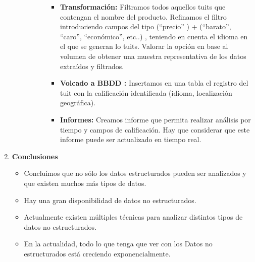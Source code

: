\documentclass[12pt,a4paper,oneside]{book}
\begin{document}
\begin{enumerate}
\begin{enumerate}
\begin{enumerate}
\begin{itemize}
\begin{itemize}
									\item \textbf{ Transformación:} Filtramos todos aquellos tuits que contengan el nombre del producto. Refinamos el filtro introduciendo campos del tipo (“precio” ) +  (“barato”, “caro”, “económico”, etc..) , teniendo en cuenta el idioma en el que  se generan lo tuits. Valorar la opción en base al volumen de obtener una muestra representativa de los datos extraídos y filtrados.
									
									\item \textbf{  Volcado a BBDD :} Insertamos en una tabla el registro del tuit con la calificación identificada (idioma, localización geográfica).
									
									\item \textbf{ Informes:} Creamos informe que permita realizar análisis por tiempo y campos de calificación. Hay que considerar que este informe puede ser actualizado en tiempo real.
									
									
									
									
								\end{itemize}
							
							
						\end{itemize}
						
						
						
					\end{enumerate}
				
				
					
				\end{enumerate}
		\item \textbf{Conclusiones } 
		
		 \begin{itemize}
			

			\item Concluimos que no sólo los datos estructurados pueden ser analizados y que existen muchos más tipos de datos.
			
			\item Hay una gran disponibilidad de datos no estructurados.
			
			\item Actualmente existen múltiples técnicas para analizar distintos tipos de datos no estructurados.
			
			\item En la actualidad, todo lo que tenga que ver con los Datos no estructurados está creciendo exponencialmente.
			
			
		\end{itemize}
	

\end{enumerate}
\end{document}

